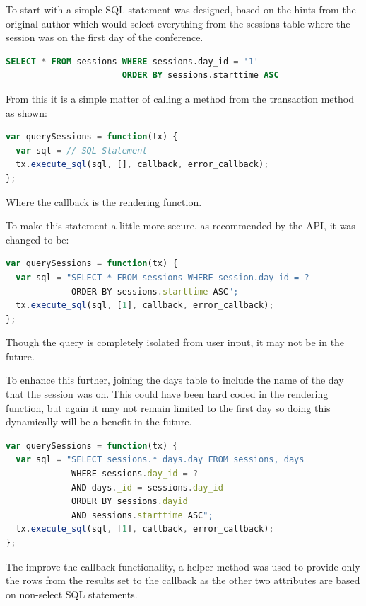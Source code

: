 \documentclass[11pt, a4paper]{article}
\begin{document}
To start with a simple SQL statement was designed, based on the hints from the
original author which would select everything from the sessions table where the
session was on the first day of the conference.

\begin{lstlisting}[language=sql]
SELECT * FROM sessions WHERE sessions.day_id = '1'
                       ORDER BY sessions.starttime ASC
\end{lstlisting}

From this it is a simple matter of calling a method from the transaction method
as shown:

\begin{lstlisting}[language=javascript]
var querySessions = function(tx) {
  var sql = // SQL Statement
  tx.execute_sql(sql, [], callback, error_callback);
};
\end{lstlisting}

Where the callback is the rendering function.

To make this statement a little more secure, as recommended by the API, it was
changed to be:

\begin{lstlisting}[language=javascript]
var querySessions = function(tx) {
  var sql = "SELECT * FROM sessions WHERE session.day_id = ? 
             ORDER BY sessions.starttime ASC";
  tx.execute_sql(sql, [1], callback, error_callback);
};
\end{lstlisting}

Though the query is completely isolated from user input, it may not be in the
future.

To enhance this further, joining the days table to include the name of the day
that the session was on. This could have been hard coded in the rendering
function, but again it may not remain limited to the first day so doing this
dynamically will be a benefit in the future.

\begin{lstlisting}[language=javascript]
var querySessions = function(tx) {
  var sql = "SELECT sessions.* days.day FROM sessions, days 
             WHERE sessions.day_id = ? 
             AND days._id = sessions.day_id 
             ORDER BY sessions.dayid 
             AND sessions.starttime ASC";
  tx.execute_sql(sql, [1], callback, error_callback);
};
\end{lstlisting}

The improve the callback functionality, a helper method was used to provide 
only the rows from the results set to the callback as the other two attributes 
are based on non-select SQL statements.
\end{document}
